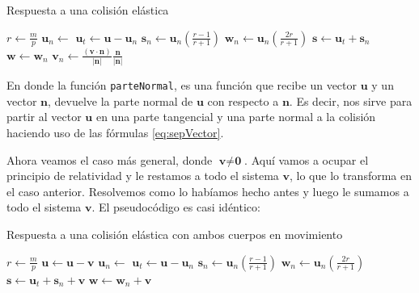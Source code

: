 {\centering
\begin{minipage}{\linewidth}
  \begin{algorithm}[H]
    \caption{Respuesta a una colisión elástica}
    \label{alg:elas}
    \begin{algorithmic}[1] %
\State $r \gets \frac{m}{p}$
\State $\textbf{u}_n \gets$ 
\State $\textbf{u}_t \gets \textbf{u} - \textbf{u}_n$
\State $\textbf{s}_n \gets \textbf{u}_n \left( \frac{r - 1}{r + 1} \right) $
\State $\textbf{w}_n \gets \textbf{u}_n \left( \frac{2r}{r + 1} \right) $
\State $\textbf{s} \gets \textbf{u}_t + \textbf{s}_n$
\State $\textbf{w} \gets \textbf{w}_n$
\State {}
\EndProcedure
{}
\State $\textbf{v}_n \gets \frac{(\textbf{v} \cdot \textbf{n})}{|\textbf{n}|} \frac{\textbf{n}}{|\textbf{n}|}$
\State {}
\EndProcedure
    \end{algorithmic}
  \end{algorithm}
\end{minipage}
\par
}

En donde la función \texttt{parteNormal}, es una función que recibe un vector $\textbf{u}$ y un vector $\textbf{n}$, devuelve la parte normal de $\textbf{u}$ con respecto a $\textbf{n}$.
Es decir, nos sirve para partir al vector $\textbf{u}$ en una parte tangencial y una parte normal a la colisión haciendo uso de las fórmulas \eqref{eq:sepVector}.

Ahora veamos el caso más general, donde $\textbf{v} \neq \textbf{0}$. Aquí vamos a ocupar el principio de relatividad y le restamos a todo el sistema $\textbf{v}$, lo que lo transforma en el caso anterior. Resolvemos como lo habíamos hecho antes y luego le sumamos a todo el sistema $\textbf{v}$. El pseudocódigo es casi idéntico:
 
{\centering
\begin{minipage}{\linewidth}
  \begin{algorithm}[H]
    \caption{Respuesta a una colisión elástica con ambos cuerpos en movimiento}
    \label{alg:elasmov}
    \begin{algorithmic}[1] %
\State $r \gets \frac{m}{p}$
\State $\textbf{u} \gets \textbf{u} - \textbf{v}$
\State $\textbf{u}_n \gets$ 
\State $\textbf{u}_t \gets \textbf{u} - \textbf{u}_n$
\State $\textbf{s}_n \gets \textbf{u}_n \left( \frac{r - 1}{r + 1} \right) $
\State $\textbf{w}_n \gets \textbf{u}_n \left( \frac{2r}{r + 1} \right) $
\State $\textbf{s} \gets \textbf{u}_t + \textbf{s}_n + \textbf{v}$
\State $\textbf{w} \gets \textbf{w}_n + \textbf{v}$
\State {}
\EndProcedure
    \end{algorithmic}
  \end{algorithm}
\end{minipage}
\par
}

